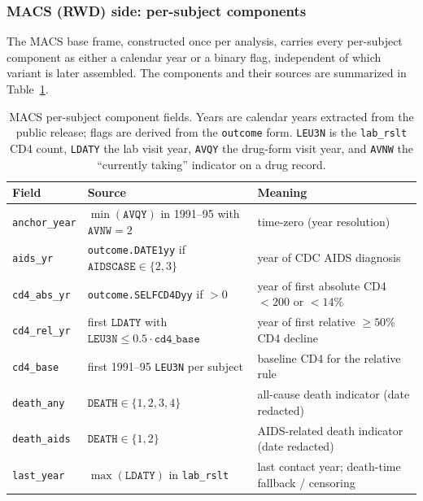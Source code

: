 \documentclass[11pt]{article}
\theoremstyle{plain}
\theoremstyle{definition}
\theoremstyle{remark}
\newcommand{\1}{\mathds{1}}
\begin{document}
\subsubsection*{MACS (RWD) side: per-subject components}

The MACS base frame, constructed once per analysis, carries every
per-subject component as either a calendar year or a binary flag,
independent of which variant is later assembled. The components and
their sources are summarized in Table~\ref{tab:macs-components}.

\begin{table}[tb]
  \centering
  \small
  \begin{tabular}{@{}lll@{}}
    \toprule
    Field & Source & Meaning \\
    \midrule
    \texttt{anchor\_year} & $\min(\texttt{AVQY})$ in 1991--95 with
        $\texttt{AVNW} = 2$ &
        time-zero (year resolution) \\
    \texttt{aids\_yr}     & \texttt{outcome.DATE1yy} if
        $\texttt{AIDSCASE} \in \{2, 3\}$ &
        year of CDC AIDS diagnosis \\
    \texttt{cd4\_abs\_yr} & \texttt{outcome.SELFCD4Dyy} if $> 0$ &
        year of first absolute CD4 $< 200$ or $< 14\%$ \\
    \texttt{cd4\_rel\_yr} & first $\texttt{LDATY}$ with
        $\texttt{LEU3N} \leq 0.5 \cdot \texttt{cd4\_base}$ &
        year of first relative $\geq 50\%$ CD4 decline \\
    \texttt{cd4\_base}    & first 1991--95 \texttt{LEU3N} per subject &
        baseline CD4 for the relative rule \\
    \texttt{death\_any}   & $\texttt{DEATH} \in \{1, 2, 3, 4\}$ &
        all-cause death indicator (date redacted) \\
    \texttt{death\_aids}  & $\texttt{DEATH} \in \{1, 2\}$ &
        AIDS-related death indicator (date redacted) \\
    \texttt{last\_year}   & $\max(\texttt{LDATY})$ in \texttt{lab\_rslt} &
        last contact year; death-time fallback / censoring \\
    \bottomrule
  \end{tabular}
  \caption{MACS per-subject component fields. Years are calendar years
    extracted from the public release; flags are derived from the
    \texttt{outcome} form. \texttt{LEU3N} is the \texttt{lab\_rslt} CD4
    count, \texttt{LDATY} the lab visit year, \texttt{AVQY} the
    drug-form visit year, and \texttt{AVNW} the ``currently taking''
    indicator on a drug record.}
  \label{tab:macs-components}
\end{table}
\end{document}
